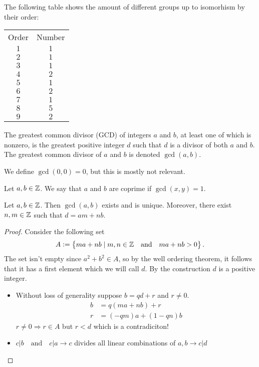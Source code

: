 \documentclass[11pt,a4paper]{article}
\begin{document}
  The following table shows the amount of different groups up to isomorhism
  by their order:
  \begin{center}
    \begin{tabular}{c | c}
        Order & Number \\
        \cline{1-2}
        $1$ & $1$ \\
        $2$ & $1$ \\
        $3$ & $1$ \\
        $4$ & $2$ \\
        $5$ & $1$ \\
        $6$ & $2$ \\
        $7$ & $1$ \\
        $8$ & $5$ \\
        $9$ & $2$
    \end{tabular}
  \end{center}

  \begin{definition}
    The greatest common divisor (GCD) of integers $a$ and $b$,
    at least one of which is nonzero,
    is the greatest positive integer $d$ such that $d$ is a divisor of 
    both $a$ and $b$.
    The greatest common divisor of $a$ and $b$ is denoted $\gcd(a,b)$.
  \end{definition}
  \begin{remark}
    We define $\gcd(0,0) = 0$, but this is mostly not relevant.
  \end{remark}

  \begin{definition}[Coprime]
    Let $a,b \in \mathbb{Z}$.
    We say that $a$ and $b$ are coprime if $\gcd(x,y) = 1$.
  \end{definition}

  \begin{proposition}
    Let $a,b \in \mathbb{Z}$. Then $\gcd(a,b)$ exists and is unique.
    Moreover, there exist $n,m \in \mathbb{Z}$ such that $d = am + nb$.
  \end{proposition}
  \begin{proof}
	Consider the following set
	\[
    A := \set{ma + nb \mid m,n \in\mathbb{Z}\quad \text{and} \quad ma + nb > 0}.
	\]
	The set isn't empty since $a^2 + b^2 \in A$,
  so by the well ordering theorem, it follows that it has a first element 
  which we will call $d$.
  By the construction $d$ is a positive integer.

	\begin{itemize}
		\item Without loss of generality suppose $b=qd+r$ and $r\ne 0$.
		\begin{align*}
			b &= q (ma + nb) + r \\
			r &= (-qm) a + (1 - qn) b
		\end{align*}
		$r \neq 0 \Rightarrow r \in A$ but $r < d$ which is a contradiciton!
		\item $c|b \quad\mathrm{and}\quad c|a \rightarrow c$ divides all linear 
      combinations of $a,b\rightarrow c|d$
	\end{itemize}
  \end{proof}
\end{document}
